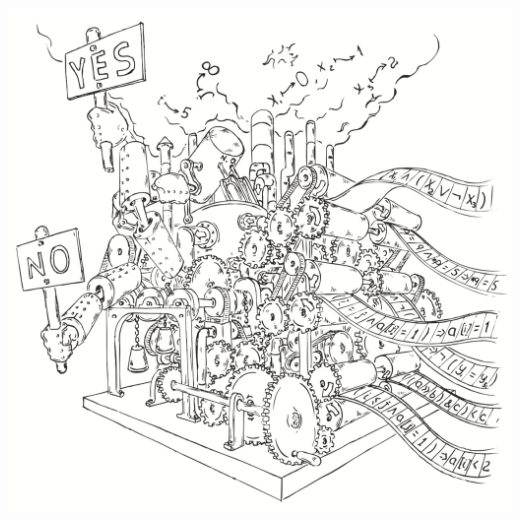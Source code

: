 \documentclass{beamer}
\begin{document}
\begin{frame}
\includegraphics[scale=0.5]{../decision-procedure.png}
\end{frame}
\end{document}
